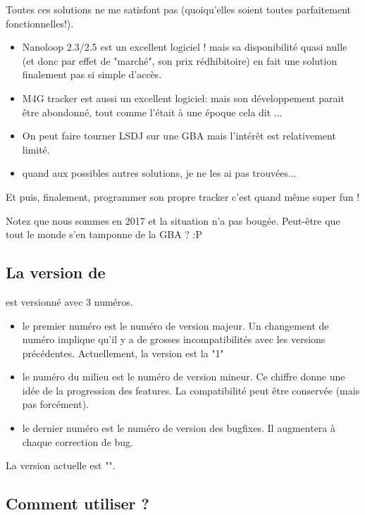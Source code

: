 Toutes ces solutions ne me satisfont pas (quoiqu'elles soient toutes parfaitement fonctionnelles!).
\medskip

\begin{itemize}
  \item{Nanoloop 2.3/2.5 est un excellent logiciel ! mais sa disponibilité quasi nulle (et donc par effet de "marché", son prix rédhibitoire) en fait une solution finalement pas si simple d'accès.}
  \item{M4G tracker est aussi un excellent logiciel: mais son développement parait être abondonné, tout comme l'était \FAT à une époque cela dit ...}
  \item{On peut faire tourner LSDJ sur une GBA mais l'intérêt est relativement limité.}
  \item{quand aux possibles autres solutions, je ne les ai pas trouvées...}
\end{itemize}\medskip

Et puis, finalement, programmer son propre tracker c'est quand même super fun !
\medskip

Notez que nous sommes en 2017 et la situation n'a pas bougée. Peut-être que tout le monde s'en tamponne de la GBA ? :P \medskip

\subsection{La version de \FAT}

\FAT est versionné avec 3 numéros.
\begin{itemize}
  \item{le premier numéro est le numéro de version majeur. Un changement de numéro implique qu'il y a de grosses incompatibilités avec les versions précédentes.
              Actuellement, la version est la "1"}
  \item{le numéro du milieu est le numéro de version mineur.
              Ce chiffre donne une idée de la progression des features. La compatibilité peut être conservée (mais pas forcément).}
  \item{le dernier numéro est le numéro de version des bugfixes. Il augmentera à chaque correction de bug.}
\end{itemize}
\medskip

La version actuelle est "\fatversion".

\subsection{Comment utiliser \FAT ?}

